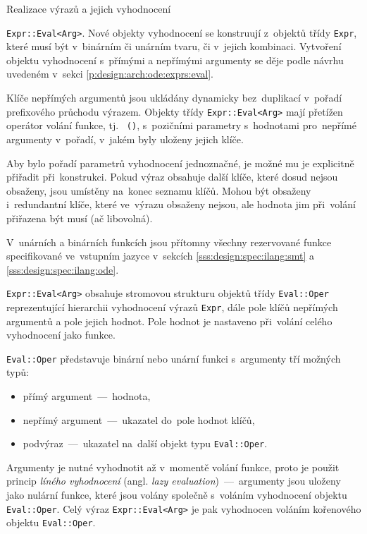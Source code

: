 \documentclass[thesis=M,czech]{FITthesis}[2012/06/26]
\newcommand{\id}[1]{\texttt{#1}}
\newcommand{\hl}[1]{\textit{#1}}
\newcommand{\name}[1]{\hl{#1}}
\newcommand{\rf}[1]{\ref{#1}}
\begin{document}
\begin{section}{Realizace výrazů a jejich vyhodnocení}

\begin{paragraph}{\id{Expr::\-Eval<Arg>}.}\label{p:impl:exprs:eval}
Nové objekty vyhodnocení se konstruují z~objektů třídy \id{Expr},
které musí být v~binárním či unárním tvaru, či v~jejich kombinaci.
Vytvoření objektu vyhodnocení s~přímými a nepřímými argumenty
se děje podle návrhu uvedeném
v~sekci \rf{p:design:arch:ode:exprs:eval}.

Klíče nepřímých argumentů jsou ukládány dynamicky bez~duplikací
v~pořadí prefixového průchodu výrazem.
Objekty třídy \id{Expr::\-Eval<Arg>} mají přetížen operátor
volání funkce, tj.~ \id{()}, s~pozičními parametry
s~hodnotami pro~nepřímé argumenty v~pořadí,
v~jakém byly uloženy jejich klíče.

Aby bylo pořadí parametrů vyhodnocení jednoznačné,
je možné mu je explicitně přiřadit při~konstrukci.
Pokud výraz obsahuje další klíče,
které dosud nejsou obsaženy,
jsou umístěny na~konec seznamu klíčů.
Mohou být obsaženy i~redundantní klíče,
které ve~výrazu obsaženy nejsou,
ale hodnota jim při~volání přiřazena být musí (ač libovolná).

V~unárních a binárních funkcích jsou přítomny všechny
rezervované funkce specifikované ve~vstupním jazyce
v~sekcích \rf{sss:design:spec:ilang:smt} a \rf{sss:design:spec:ilang:ode}.

\id{Expr::\-Eval<Arg>} obsahuje stromovou strukturu
objektů třídy \id{Eval::\-Oper}
reprezentující hierarchii vyhodnocení výrazů \id{Expr},
dále pole klíčů nepřímých argumentů a pole jejich hodnot.
Pole hodnot je nastaveno při~volání celého vyhodnocení jako funkce.

\id{Eval::\-Oper} představuje binární nebo unární funkci
s~argumenty tří možných typů:
\begin{itemize}
\item přímý argument~---~hodnota,
\item nepřímý argument~---~ukazatel do~pole hodnot klíčů,
\item podvýraz~---~ukazatel na~další objekt typu \id{Eval::\-Oper}.
\end{itemize}
Argumenty je nutné vyhodnotit až v~momentě volání funkce,
proto je použit princip \name{líného vyhodnocení}
(angl. \name{lazy evaluation})~---~argumenty jsou uloženy
jako nulární funkce, které jsou volány společně
s~voláním vyhodnocení objektu \id{Eval::\-Oper}.
Celý výraz \id{Expr::\-Eval<Arg>} je pak vyhodnocen
voláním kořenového objektu \id{Eval::\-Oper}.


\end{paragraph}
\end{section}
\end{document}
